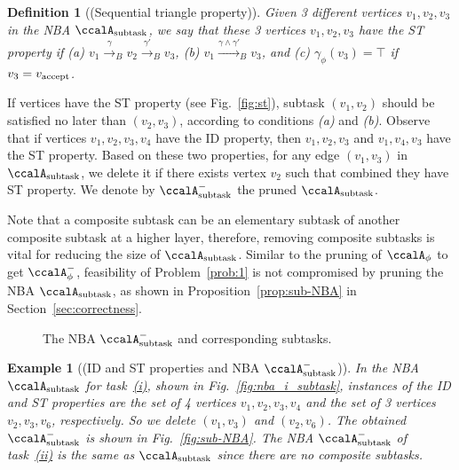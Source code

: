 \documentclass[Afour,sageh,times]{sagej}
\newtheorem{exmp}{Example}
\newtheorem{defn}[thm]{Definition}
\newcommand{\auto}[1]{\ccalA_{\textup{#1}}}
\newcommand{\autop}{\ccalA_{\phi}}
\newcommand{\vertex}[1]{v_{\textup{#1}}}
\newenvironment{cexmp}
{\addtocounter{exmp}{-1}\begin{exmp}}
  {\end{exmp}}
\begin{document}
\begin{defn}[(Sequential triangle property)]\label{defn:st}
  Given 3 different vertices $v_1, v_2, v_3$ in the NBA $\auto{subtask}$, we say that these 3 vertices $v_1, v_2, v_3$ have the ST property if %
(a) $v_1 \xrightarrow{\gamma}_B v_2 \xrightarrow{\gamma'}_B v_3$,  (b) $v_1 \xrightarrow{\gamma \wedge \gamma'}_B v_3$, and (c) $\gamma_{\phi}(v_3) = \top$ if $v_3 = \vertex{accept}$.
\end{defn}

If vertices have the ST  property (see Fig.~\ref{fig:st}), subtask $(v_1, v_2)$ should be satisfied no later than $(v_2, v_3)$, according to conditions {\it (a)} and {\it (b)}. Observe that if vertices $v_1, v_2, v_3, v_4$ have the ID property, then $v_1, v_2, v_3$ and $v_1, v_4, v_3$ have the ST property. Based on these two properties, for any edge $(v_1, v_3)$ in $\auto{subtask}$, we delete it if there exists  vertex $v_2$ such that combined they have  ST property. We denote by $\auto{subtask}^-$ the pruned $\auto{subtask}$.

Note that a composite subtask can be an elementary subtask of another composite subtask at a higher layer, therefore, removing composite subtasks  is vital for reducing the size of $\auto{subtask}$. Similar to the pruning of $\autop$ to get $\autop^-$, feasibility of Problem~\ref{prob:1} is not compromised by pruning the NBA $\auto{subtask}$, as shown in Proposition~\ref{prop:sub-NBA} in Section~\ref{sec:correctness}. %
\begin{figure}[t]
    \centering
    \subfigure[$\auto{subtask}^-$]{
      \label{fig:sub-NBA}
      \texttt{[image: nba\_i\_subtask\_prune.pdf]}}
    \hspace{2em}
        \caption{The NBA $\auto{subtask}^-$ and corresponding subtasks.} \label{fig:subtask_prune}
\end{figure}
\begin{cexmp} [(ID and ST properties and NBA $\auto{subtask}^-$)]
  In the NBA $\auto{subtask}$ for task~\hyperref[task:i]{\it (i)}, shown in Fig.~\ref{fig:nba_i_subtask}, instances of the ID and ST properties are the set of 4 vertices $v_1, v_2, v_3, v_4$ and the set of 3 vertices $v_2, v_3, v_6$, respectively. So we delete $(v_1, v_3)$ and $(v_2, v_6)$. The obtained $\auto{subtask}^-$ is shown in Fig.~\ref{fig:sub-NBA}. The NBA $\auto{subtask}^-$ of task~\hyperref[task:ii]{\it (ii)} is the same as $\auto{subtask}$ since there are no composite subtasks.
\end{cexmp}
\end{document}
